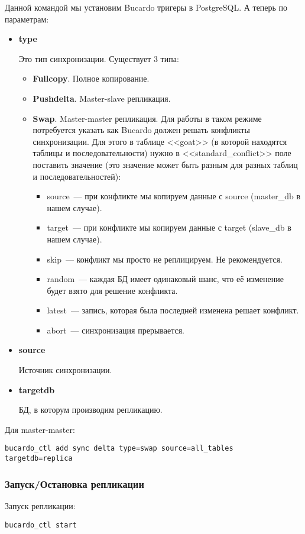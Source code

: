 Данной командой мы установим Bucardo тригеры в PostgreSQL. А теперь по параметрам:
\begin{itemize}
\item \textbf{type}

Это тип синхронизации. Существует 3 типа:
\begin{itemize}
\item \textbf{Fullcopy}. Полное копирование.
\item \textbf{Pushdelta}. Master-slave репликация.
\item \textbf{Swap}. Master-master репликация. 
Для работы в таком режиме потребуется указать как Bucardo должен решать конфликты синхронизации.
Для этого в таблице <<goat>> (в которой находятся таблицы и последовательности) нужно в <<standard\_conflict>> 
поле поставить значение (это значение может быть разным для разных таблиц и последовательностей):
\begin{itemize}
\item source~--- при конфликте мы копируем данные с source (master\_db в нашем случае).
\item target~--- при конфликте мы копируем данные с target (slave\_db в нашем случае).
\item skip~--- конфликт мы просто не реплицируем. Не рекомендуется.
\item random~--- каждая БД имеет одинаковый шанс, что её изменение будет взято для решение конфликта.
\item latest~--- запись, которая была последней изменена решает конфликт.
\item abort~--- синхронизация прерывается.
\end{itemize}
\end{itemize}

\item \textbf{source}

Источник синхронизации.

\item \textbf{targetdb}

БД, в которум производим репликацию.
\end{itemize}

Для master-master:
\begin{lstlisting}[label=lst:bucardo10,caption=Настройка синхронизации]
bucardo_ctl add sync delta type=swap source=all_tables targetdb=replica
\end{lstlisting}

\subsubsection{Запуск/Остановка репликации}
Запуск репликации:
\begin{lstlisting}[label=lst:bucardo11,caption=Запуск репликации]
bucardo_ctl start
\end{lstlisting}

